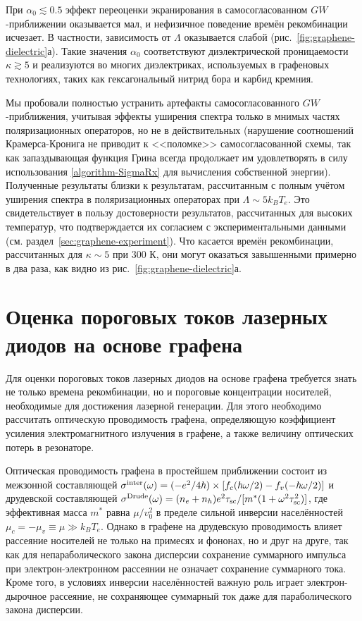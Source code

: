 При $\alpha_0 \lesssim 0.5$ эффект переоценки экранирования в самосогласованном $GW$-приближении оказывается мал, и нефизичное поведение времён рекомбинации исчезает. В частности, зависимость от $\Lambda$ оказывается слабой (рис.~\ref{fig:graphene-dielectric}а). Такие значения $\alpha_0$ соответствуют диэлектрической проницаемости $\kappa \gtrsim 5$ и реализуются во многих диэлектриках, используемых в графеновых технологиях, таких как гексагональный нитрид бора и карбид кремния.

Мы пробовали полностью устранить артефакты самосогласованного $GW$-приближения, учитывая эффекты уширения спектра только в мнимых частях поляризационных операторов, но не в действительных (нарушение соотношений Крамерса-Кронига не приводит к <<поломке>> самосогласованной схемы, так как запаздывающая функция Грина всегда продолжает им удовлетворять в силу использования \eqref{algorithm-SigmaRx} для вычисления собственной энергии). Полученные результаты близки к результатам, рассчитанным с полным учётом уширения спектра в поляризационных операторах при $\Lambda \sim 5 k_B T_e$. Это свидетельствует в пользу достоверности результатов, рассчитанных для высоких температур, что подтверждается их согласием с экспериментальными данными (см. раздел~\ref{sec:graphene-experiment}). Что касается времён рекомбинации, рассчитанных для $\kappa \sim 5$ при 300 К, они могут оказаться завышенными примерно в два раза, как видно из рис.~\ref{fig:graphene-dielectric}а.

\section{Оценка пороговых токов лазерных диодов на основе графена} \label{sec:graphene-threshold_currents}
Для оценки пороговых токов лазерных диодов на основе графена требуется знать не только времена рекомбинации, но и пороговые концентрации носителей, необходимые для достижения лазерной генерации. Для этого необходимо рассчитать оптическую проводимость графена, определяющую коэффициент усиления электромагнитного излучения в графене, а также величину оптических потерь в резонаторе.

Оптическая проводимость графена в простейшем приближении состоит из межзонной составляющей $\sigma^{\rm inter}(\omega) = (-e^2/4\hbar)\times \left[ f_c(\hbar\omega/2) - f_v(-\hbar\omega/2) \right]$ и друдевской составляющей $\sigma^{\rm Drude}(\omega) = (n_e+n_h)e^2 \tau_{\rm sc}/[m^{*}(1+\omega^2 \tau_{\rm sc}^2)]$, где эффективная масса $m^{*}$ равна $\mu/v_0^2$ в пределе сильной инверсии населённостей $\mu_c = -\mu_v \equiv \mu \gg k_B T_e$. Однако в графене на друдевскую проводимость влияет рассеяние носителей не только на примесях и фононах, но и друг на друге, так как для непараболического закона дисперсии сохранение суммарного импульса при электрон-электронном рассеянии не означает сохранение суммарного тока. Кроме того, в условиях инверсии населённостей важную роль играет электрон-дырочное рассеяние, не сохраняющее суммарный ток даже для параболического закона дисперсии.

